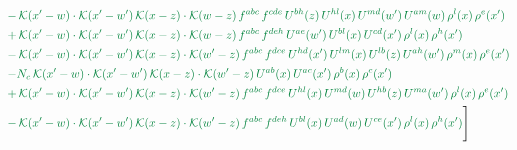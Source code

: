\documentclass[10pt]{article}
\numberwithin{equation}{section}
\begin{document}
\begin{align}
&{\color{JIM} -\,\mathcal{K}(x'-w)\cdot\mathcal{K}(x'-w')\,\mathcal{K}(x-z)\cdot\mathcal{K}(w-z)\,f^{abc}\,f^{cde}\,U^{bh}(z)\,U^{hl}(x)\,U^{md}(w')\,U^{am}(w)\,\rho^{l}(x)\,\rho^{e}(x')} \notag\\
&{\color{JIM} +\,\mathcal{K}(x'-w)\cdot\mathcal{K}(x'-w')\,\mathcal{K}(x-z)\cdot\mathcal{K}(w-z)\,f^{abc}\,f^{deh}\,U^{ae}(w')\,U^{bl}(x)\,U^{cd}(x')\,\rho^{l}(x)\,\rho^{h}(x')} \notag\\
&{\color{JIM} -\,\mathcal{K}(x'-w)\cdot\mathcal{K}(x'-w')\,\mathcal{K}(x-z)\cdot\mathcal{K}(w'-z)\,f^{abc}\,f^{dce}\,U^{hd}(x')\,U^{lm}(x)\,U^{lb}(z)\,U^{ah}(w')\,\rho^{m}(x)\,\rho^{e}(x')} \notag\\
&{\color{JIM} -N_{c}\,\mathcal{K}(x'-w)\cdot\mathcal{K}(x'-w')\,\mathcal{K}(x-z)\cdot\mathcal{K}(w'-z)\,U^{ab}(x)\,U^{ac}(x')\,\rho^{b}(x)\,\rho^{c}(x')} \notag\\
&{\color{JIM} +\,\mathcal{K}(x'-w)\cdot\mathcal{K}(x'-w')\,\mathcal{K}(x-z)\cdot\mathcal{K}(w'-z)\,f^{abc}\,f^{dce}\,U^{hl}(x)\,U^{md}(w)\,U^{hb}(z)\,U^{ma}(w')\,\rho^{l}(x)\,\rho^{e}(x')} \notag\\
&{\color{JIM} -\,\mathcal{K}(x'-w)\cdot\mathcal{K}(x'-w')\,\mathcal{K}(x-z)\cdot\mathcal{K}(w'-z)\,f^{abc}\,f^{deh}\,U^{bl}(x)\,U^{ad}(w)\,U^{ce}(x')\,\rho^{l}(x)\,\rho^{h}(x')}\Bigg] \end{align}
\end{document}
